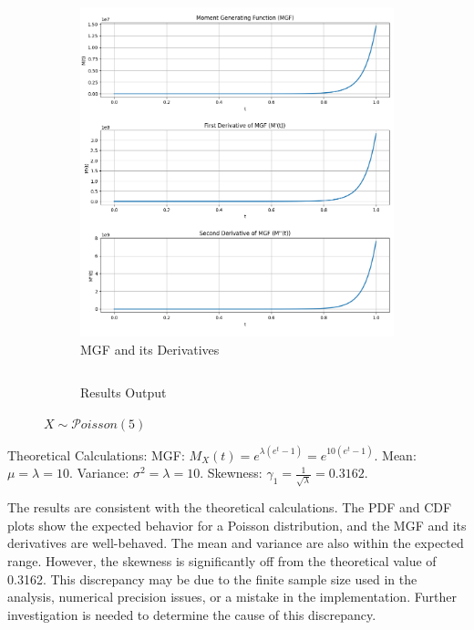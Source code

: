 \documentclass{article}
\begin{document}
\begin{figure}[H]
\begin{subfigure}{0.45\textwidth}
    \includegraphics[width=\linewidth]{results/section1/e1(2).png}
    \caption{MGF and its Derivatives}
  \end{subfigure}
  \begin{subfigure}{\textwidth}
    \inputminted{text}{results/section1/e1.txt}
    \caption{Results Output}
  \end{subfigure}
  \caption{$X\sim \mathcal{P}oisson(5)$}
\end{figure}

Theoretical Calculations:
MGF: $M_X(t) = e^{\lambda(e^t-1)}=e^{10(e^t-1)}$.
Mean: $\mu = \lambda=10$.
Variance: $\sigma^2 = \lambda=10$.
Skewness: $\gamma_1 = \frac{1}{\sqrt{\lambda}}=0.3162$.

The results are consistent with the theoretical calculations. The PDF and CDF plots show the expected behavior for a Poisson distribution, and the MGF and its derivatives are well-behaved. The mean and variance are also within the expected range. However, the skewness is significantly off from the theoretical value of 0.3162. This discrepancy may be due to the finite sample size used in the analysis, numerical precision issues, or a mistake in the implementation. Further investigation is needed to determine the cause of this discrepancy.

\newpage
\end{document}

